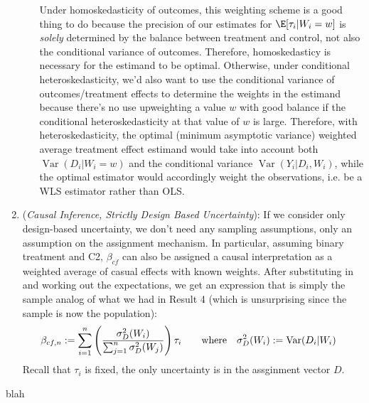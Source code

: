 \documentclass[12pt]{article}
\theoremstyle{plain}
\theoremstyle{definition}
\theoremstyle{remark}
\newcommand{\Var}{\operatorname{Var}}
\newcommand{\sumin}{\sum^n_{i=1}}
\newcommand{\sumjn}{\sum^n_{j=1}}
\begin{document}
\begin{enumerate}
\begin{itemize}
        Under homoskedasticity of outcomes, this weighting scheme is a
        good thing to do because the precision of our estimates for
        $\E[\tau_i|W_i=w]$ is \emph{solely} determined by the balance
        between treatment and control, not also the conditional variance
        of outcomes.
        Therefore, homoskedasticy is necessary for the estimand to be
        optimal.
        Otherwise, under conditional heteroskedasticity, we'd also want
        to use the conditional variance of outcomes/treatment effects to
        determine the weights in the estimand because there's no use
        upweighting a value $w$ with good balance if the conditional
        heteroskedasticity at that value of $w$ is large.
        Therefore, with heteroskedasticity, the optimal (minimum
        asymptotic variance) weighted average treatment effect estimand
        would take into account both $\Var(D_i|W_i=w)$ and the
        conditional variance $\Var(Y_i|D_i,W_i)$, while the optimal
        estimator would accordingly weight the observations, i.e. be a
        WLS estimator rather than OLS.
    \end{itemize}


  \item
    (\emph{Causal Inference, Strictly Design Based Uncertainty}):
    If we consider only design-based uncertainty, we don't need any
    sampling assumptions, only an assumption on the assignment
    mechanism.
    In particular, assuming binary treatment and C2, $\beta_{cf}$ can
    also be assigned a causal interpretation as a weighted average of
    casual effects with known weights.
    After substituting in and working out the expectations,
    we get an expression that is simply the sample analog of what we had
    in Result 4 (which is unsurprising since the sample is now the
    population):
    \begin{align*}
      \beta_{cf,n}
      &:=
      \sumin
      \left(
      \frac{%
        \sigma^2_D(W_i)
      }{%
        \sumjn \sigma^2_D(W_j)
      }
      \right)
      \tau_i
      \qquad\text{where}\quad
      \sigma^2_D(W_i)
      :=
      \Var(D_i|W_i)
    \end{align*}
    Recall that $\tau_i$ is fixed, the only uncertainty is in the
    assginment vector $D$.

\end{enumerate}

\clearpage
blah
\end{document}
